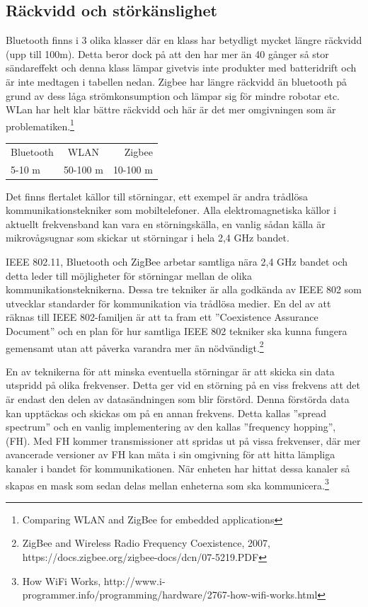 \documentclass[a4paper,12pt,fleqn]{article}
\begin{document}
\newpage
\subsection{Räckvidd och störkänslighet}
Bluetooth finns i 3 olika klasser där en klass har betydligt mycket längre räckvidd (upp till 100m). Detta beror dock på att den har mer än 40 gånger så stor sändareffekt och denna klass lämpar givetvis inte produkter med batteridrift och är inte medtagen i tabellen nedan. Zigbee har längre räckvidd än bluetooth på grund av dess låga strömkonsumption och lämpar sig för mindre robotar etc. 
WLan har helt klar bättre räckvidd och  här är det mer omgivningen som är problematiken.\footnote{
Comparing WLAN and ZigBee for embedded applications}

\begin{tabular}{lcr}
	\hline
	Bluetooth & WLAN & Zigbee \\
	5-10 m  & 50-100 m   & 10-100 m\\
	\hline
 \end{tabular}
\newline

Det finns flertalet källor till störningar, ett exempel är andra trådlösa kommunikationstekniker som mobiltelefoner. Alla elektromagnetiska källor i aktuellt frekvensband kan vara en störningskälla, en vanlig sådan källa är mikrovågsugnar som skickar ut störningar i hela 2,4 GHz bandet.

IEEE 802.11, Bluetooth och ZigBee arbetar samtliga nära 2,4 GHz bandet och detta leder till möjligheter för störningar mellan de olika kommunikationsteknikerna. Dessa tre tekniker är alla godkända av IEEE 802 som utvecklar standarder för kommunikation via trådlösa medier. En del av att räknas till IEEE 802-familjen är att ta fram ett ''Coexistence Assurance Document'' och en plan för hur samtliga IEEE 802 tekniker ska kunna fungera gemensamt utan att påverka varandra mer än nödvändigt.\footnote{ZigBee and Wireless Radio
Frequency Coexistence, 2007, https://docs.zigbee.org/zigbee-docs/dcn/07-5219.PDF}

En av teknikerna för att minska eventuella störningar är att skicka sin data utspridd på olika frekvenser. Detta ger vid en störning på en viss frekvens att det är endast den delen av datasändningen som blir förstörd. Denna förstörda data kan upptäckas och skickas om på en annan frekvens. Detta kallas ''spread spectrum'' och en vanlig implementering av den kallas ''frequency hopping'', (FH). Med FH kommer transmissioner att spridas ut på vissa frekvenser, där mer avancerade versioner av FH kan mäta i sin omgivning för att hitta lämpliga kanaler i bandet för kommunikationen. När enheten har hittat dessa kanaler så skapas en mask som sedan delas mellan enheterna som ska kommunicera.\footnote{
How WiFi Works, http://www.i-programmer.info/programming/hardware/2767-how-wifi-works.html}
\end{document}
